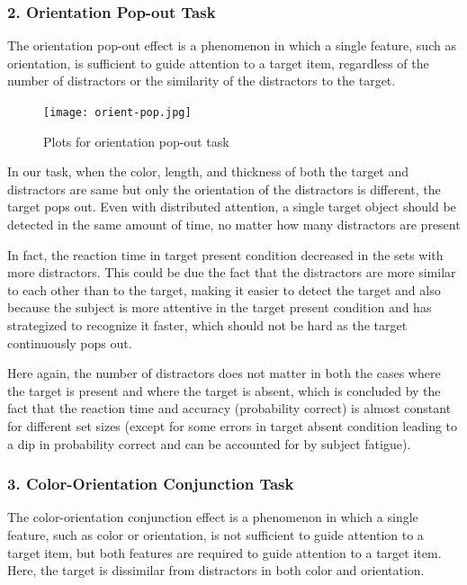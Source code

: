 \documentclass{report}
\begin{document}
\subsubsection{2. Orientation Pop-out Task}

The orientation pop-out effect is a phenomenon in which a single 
feature, such as orientation, is sufficient to guide attention to a 
target item, regardless of the number of distractors or the 
similarity of the distractors to the target.


\begin{figure}[htbp]  
  \centering 
  \texttt{[image: orient-pop.jpg]} 
  \caption{Plots for orientation pop-out task}
  \label{fig: orientation pop-out} 
\end{figure}

In our task, when the color, length, and thickness of both 
the target and distractors are same but only the orientation of 
the distractors is different, the target pops out. Even with 
distributed attention, a single target object should be detected 
in the same amount of time, no matter how many distractors are present

In fact, the reaction time in target present condition decreased 
in the sets with more distractors. This could be due the 
fact that the distractors are more similar to each other than to 
the target, making it easier to detect the target and also because 
the subject is more attentive in the target present condition and 
has strategized to recognize it faster, which should not be hard as 
the target continuously pops out. 

Here again, the number of distractors 
does not matter in both the cases where the target is present and where 
the target is absent, which is concluded by the fact that the reaction 
time and accuracy (probability correct) is almost constant for different 
set sizes (except for some errors in target absent condition leading 
to a dip in probability correct and can be accounted for by subject fatigue).



\subsubsection{3. Color-Orientation Conjunction Task}

The color-orientation conjunction effect is a phenomenon in which a 
single feature, such as color or orientation, is not sufficient to 
guide attention to a target item, but both features are required to 
guide attention to a target item. Here, the target is dissimilar 
from distractors in both color and orientation.
\end{document}
